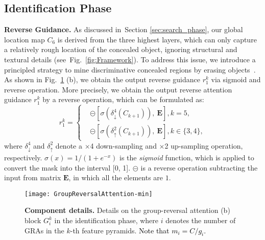 \documentclass[10pt,journal,compsoc]{IEEEtran}
\newcommand{\myPara}[1]{\vspace{6pt}\noindent\textbf{#1}\qquad }
\newcommand{\figref}[1]{Fig.~\ref{#1}}
\newcommand{\secref}[1]{Section \ref{#1}}
\newcommand{\Rev}[1]{\textcolor{black}{#1}}
\begin{document}
\subsection{Identification Phase}\label{sec:identification_phase}

\myPara{Reverse Guidance.}
%
As discussed in~\secref{sec:search_phase}, 
our global location map $C_6$ is derived from the three highest layers, 
which can only capture a relatively rough location of the concealed object, 
ignoring structural and textural details (see~\figref{fig:Framework}).
%
To address this issue, we introduce a principled strategy to mine
discriminative concealed regions 
by erasing objects~\cite{wei2017object,chen2018reverse,fan2020pranet}.
%
As shown in \figref{fig:GRA} (b), 
we obtain the output reverse guidance $r_1^k$ via sigmoid and reverse operation.
%
More precisely, we obtain the output reverse attention guidance $r_1^k$ 
by a reverse operation, which can be formulated as:
%
\begin{equation} \label{RA1}
r_1^k = \left\{ 
\begin{aligned} 
& \circleddash\left[ \sigma(\delta^{4}_{\downarrow}(C_{k+1})),~\mathbf{E} \right], k =5,\\ 
& \circleddash\left[ \sigma(\delta^{2}_{\uparrow}(C_{k+1})),~\mathbf{E} \right], k \in \{ 3,4 \}, 
\end{aligned} \right.
\end{equation}
where $\delta^{4}_{\downarrow}$ and $\delta^{2}_{\uparrow}$ denote a 
$\times$4 down-sampling and $\times$2 up-sampling operation, respectively. 
%
$\sigma(x) = 1/(1+e^{-x})$ is the \textit{sigmoid} function, 
which is applied to convert the mask into the interval [0, 1].
%
$\circleddash$ is a reverse operation subtracting the input from matrix 
$\mathbf{E}$, in which all the elements are $1$.


\begin{figure}[t!]
  \centering
  \texttt{[image: GroupReversalAttention-min]}\\
  \vspace{-10pt}
  \caption{\textbf{Component details.}
    Details on the group-reversal attention (b) block $G_i^k$ 
    in the identification phase, 
    where $i$ denotes the number of GRAs in the $k$-th feature pyramids. \Rev{Note that $m_i = C/g_i$.}
  }\label{fig:GRA}
\end{figure}
\end{document}
